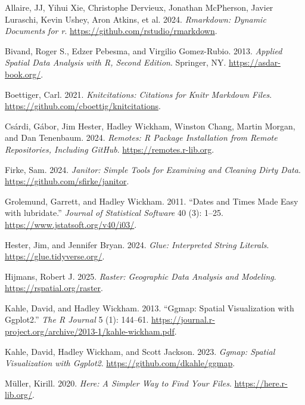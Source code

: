 \documentclass[
]{article}
\newlength{\cslhangindent}
\newenvironment{CSLReferences}[2] %
 {\begin{list}{}{%
  \setlength{\itemindent}{0pt}
  \setlength{\leftmargin}{0pt}
  \setlength{\parsep}{0pt}
  \ifodd #1
   \setlength{\leftmargin}{\cslhangindent}
   \setlength{\itemindent}{-1\cslhangindent}
  \fi
  \setlength{\itemsep}{#2\baselineskip}}}
 {\end{list}}
\begin{document}
\label{refs}
\begin{CSLReferences}{1}{0}
Allaire, JJ, Yihui Xie, Christophe Dervieux, Jonathan McPherson, Javier
Luraschi, Kevin Ushey, Aron Atkins, et al. 2024. \emph{Rmarkdown:
Dynamic Documents for r}. \url{https://github.com/rstudio/rmarkdown}.

Bivand, Roger S., Edzer Pebesma, and Virgilio Gomez-Rubio. 2013.
\emph{Applied Spatial Data Analysis with {R}, Second Edition}. Springer,
NY. \url{https://asdar-book.org/}.

Boettiger, Carl. 2021. \emph{Knitcitations: Citations for Knitr Markdown
Files}. \url{https://github.com/cboettig/knitcitations}.

Csárdi, Gábor, Jim Hester, Hadley Wickham, Winston Chang, Martin Morgan,
and Dan Tenenbaum. 2024. \emph{Remotes: R Package Installation from
Remote Repositories, Including GitHub}. \url{https://remotes.r-lib.org}.

Firke, Sam. 2024. \emph{Janitor: Simple Tools for Examining and Cleaning
Dirty Data}. \url{https://github.com/sfirke/janitor}.

Grolemund, Garrett, and Hadley Wickham. 2011. {``Dates and Times Made
Easy with {lubridate}.''} \emph{Journal of Statistical Software} 40 (3):
1--25. \url{https://www.jstatsoft.org/v40/i03/}.

Hester, Jim, and Jennifer Bryan. 2024. \emph{Glue: Interpreted String
Literals}. \url{https://glue.tidyverse.org/}.

Hijmans, Robert J. 2025. \emph{Raster: Geographic Data Analysis and
Modeling}. \url{https://rspatial.org/raster}.

Kahle, David, and Hadley Wickham. 2013. {``Ggmap: Spatial Visualization
with Ggplot2.''} \emph{The R Journal} 5 (1): 144--61.
\url{https://journal.r-project.org/archive/2013-1/kahle-wickham.pdf}.

Kahle, David, Hadley Wickham, and Scott Jackson. 2023. \emph{Ggmap:
Spatial Visualization with Ggplot2}.
\url{https://github.com/dkahle/ggmap}.

Müller, Kirill. 2020. \emph{Here: A Simpler Way to Find Your Files}.
\url{https://here.r-lib.org/}.


\end{CSLReferences}
\end{document}
